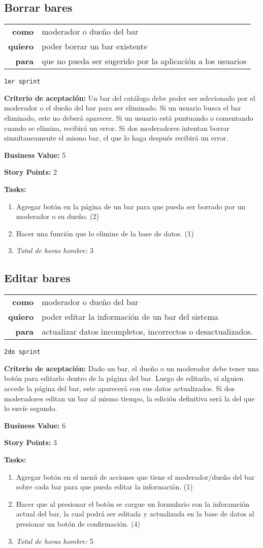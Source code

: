 \documentclass[hidelinks,a4paper,11pt, nofootinbib]{article}
\newcommand{\userstory}[3]{
\begin{tabular}{|r p{10cm}|}
  \hline
  \textbf{como} & #1 \\
  \textbf{quiero} & #2 \\
  \textbf{para} & #3 \\
  \hline
\end{tabular}

}
\newcommand{\critdeacep}[1]{\textbf{Criterio de aceptación:} #1

}
\newcommand{\busvalue}[1]{\textbf{Business Value:} #1

}
\newcommand{\storypoints}[1]{\textbf{Story Points:} #1

}
\newcommand{\primersprint}{\texttt{1er sprint}

}
\newcommand{\segundosprint}{\texttt{2do sprint}

}
\newcommand{\tasks}[1]{\textbf{Tasks:} 

#1}
\begin{document}
\subsection*{Borrar bares}
\userstory{moderador o dueño del bar}{poder borrar un bar existente}{que no pueda ser sugerido por la aplicación a los usuarios}
\primersprint
\critdeacep{Un bar del catálogo debe poder ser selccionado por el moderador o el dueño del bar para ser eliminado. Si un usuario busca el bar eliminado, este no deberá aparecer. Si un usuario está puntuando o comentando cuando se elimina, recibirá un error. Si dos moderadores intentan borrar simultaneamente el mismo bar, el que lo haga después recibirá un error.}
\busvalue{5}
\storypoints{2}
\tasks{
  \begin{enumerate}
    \item Agregar botón en la página de un bar para que pueda ser borrado por un moderador o su dueño. (2)
    \item Hacer una función que lo elimine de la base de datos. (1)
    \item[] \textit{Total de horas hombre:} 3
  \end{enumerate}
}

\subsection*{Editar bares}
\userstory{moderador o dueño del bar}{poder editar la información de un bar del sistema}{actualizar datos incompletos, incorrectos o desactualizados.
}
\segundosprint
\critdeacep{Dado un bar, el dueño o un moderador debe tener una botón para editarlo dentro de la página del bar. Luego de editarlo, si alguien accede la página del bar, este aparecerá con sus datos actualizados. Si dos moderadores editan un bar al mismo tiempo, la edición definitiva será la del que lo envíe segundo.}
\busvalue{6}
\storypoints{3}
\tasks{
  \begin{enumerate}
    \item Agregar botón en el menú de acciones que tiene el moderador/dueño del bar sobre cada bar para que pueda editar la información. (1)
    \item Hacer que al presionar el botón se cargue un formulario con la inforamción actual del bar, la cual podrá ser editada y actualizada en la base de datos al presionar un botón de confirmación. (4)
    \item[] \textit{Total de horas hombre:} 5
  \end{enumerate}
}
    
\end{document}
